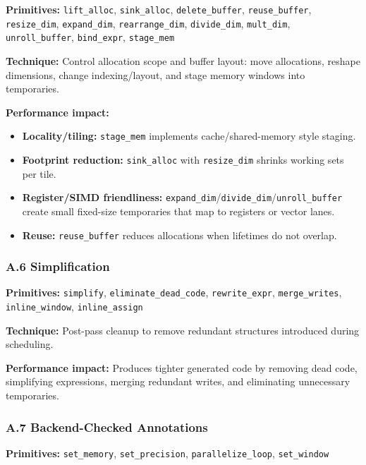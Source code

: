 \textbf{Primitives:} \texttt{lift\_alloc}, \texttt{sink\_alloc}, \texttt{delete\_buffer}, \texttt{reuse\_buffer},
\texttt{resize\_dim}, \texttt{expand\_dim}, \texttt{rearrange\_dim}, \texttt{divide\_dim}, \texttt{mult\_dim},
\texttt{unroll\_buffer}, \texttt{bind\_expr}, \texttt{stage\_mem}

\textbf{Technique:} Control allocation scope and buffer layout: move allocations, reshape dimensions, change indexing/layout, and stage memory windows into temporaries.

\textbf{Performance impact:}
\begin{itemize}
  \item \textbf{Locality/tiling:} \texttt{stage\_mem} implements cache/shared-memory style staging.
  \item \textbf{Footprint reduction:} \texttt{sink\_alloc} with \texttt{resize\_dim} shrinks working sets per tile.
  \item \textbf{Register/SIMD friendliness:} \texttt{expand\_dim}/\texttt{divide\_dim}/\texttt{unroll\_buffer} create small fixed-size temporaries that map to registers or vector lanes.
  \item \textbf{Reuse:} \texttt{reuse\_buffer} reduces allocations when lifetimes do not overlap.
\end{itemize}

\hypertarget{a.6-simplification}{%
\subsubsection{A.6 Simplification}\label{a.6-simplification}}

\textbf{Primitives:} \texttt{simplify}, \texttt{eliminate\_dead\_code}, \texttt{rewrite\_expr}, \texttt{merge\_writes},
\texttt{inline\_window}, \texttt{inline\_assign}

\textbf{Technique:} Post-pass cleanup to remove redundant structures introduced during scheduling.

\textbf{Performance impact:} Produces tighter generated code by removing dead code, simplifying expressions, merging redundant writes, and eliminating unnecessary temporaries.

\hypertarget{a.7-backend-checked-annotations}{%
\subsubsection{A.7 Backend-Checked Annotations}\label{a.7-backend-checked-annotations}}

\textbf{Primitives:} \texttt{set\_memory}, \texttt{set\_precision}, \texttt{parallelize\_loop}, \texttt{set\_window}

